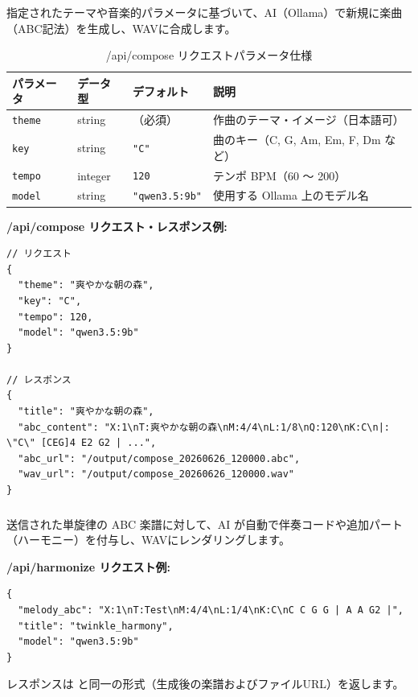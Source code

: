 \subsubsection{\texorpdfstring{}{POST /api/compose}}
指定されたテーマや音楽的パラメータに基づいて、AI（Ollama）で新規に楽曲（ABC記法）を生成し、WAVに合成します。

\begin{table}[htbp]
  \centering
  \caption{/api/compose リクエストパラメータ仕様}
  \label{tab:api_compose_params}
  \begin{tabularx}{\textwidth}{l l l X}
    \toprule
    \textbf{パラメータ} & \textbf{データ型} & \textbf{デフォルト} & \textbf{説明} \\
    \midrule
    \texttt{theme} & string & （必須） & 作曲のテーマ・イメージ（日本語可） \\
    \texttt{key} & string & \texttt{"C"} & 曲のキー（C, G, Am, Em, F, Dm など） \\
    \texttt{tempo} & integer & \texttt{120} & テンポ BPM（60 〜 200） \\
    \texttt{model} & string & \texttt{"qwen3.5:9b"} & 使用する Ollama 上のモデル名 \\
    \bottomrule
  \end{tabularx}
\end{table}

\textbf{/api/compose リクエスト・レスポンス例:}\\
\begin{lstlisting}
// リクエスト
{
  "theme": "爽やかな朝の森",
  "key": "C",
  "tempo": 120,
  "model": "qwen3.5:9b"
}

// レスポンス
{
  "title": "爽やかな朝の森",
  "abc_content": "X:1\nT:爽やかな朝の森\nM:4/4\nL:1/8\nQ:120\nK:C\n|: \"C\" [CEG]4 E2 G2 | ...",
  "abc_url": "/output/compose_20260626_120000.abc",
  "wav_url": "/output/compose_20260626_120000.wav"
}
\end{lstlisting}

\subsubsection{\texorpdfstring{}{POST /api/harmonize}}
送信された単旋律の ABC 楽譜に対して、AI が自動で伴奏コードや追加パート（ハーモニー）を付与し、WAVにレンダリングします。

\textbf{/api/harmonize リクエスト例:}\\
\begin{lstlisting}
{
  "melody_abc": "X:1\nT:Test\nM:4/4\nL:1/4\nK:C\nC C G G | A A G2 |",
  "title": "twinkle_harmony",
  "model": "qwen3.5:9b"
}
\end{lstlisting}
レスポンスは  と同一の形式（生成後の楽譜およびファイルURL）を返します。

